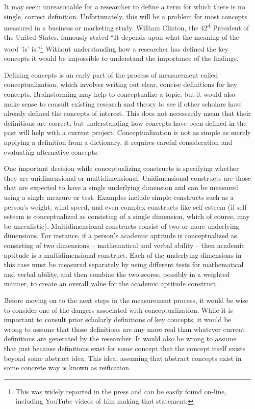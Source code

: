 It may seem unreasonable for a researcher to define a term for which there is no single, correct definition. Unfortunately, this will be a problem for most concepts measured in a business or marketing study. William Clinton, the 42\textsuperscript{d} President of the United States, famously stated ``It depends upon what the meaning of the word 'is' is.''\footnote{This was widely reported in the press and can be easily found on-line, including YouTube videos of him making that statement.} Without understanding how a researcher has defined the key concepts it would be impossible to understand the importance of the findings.

Defining concepts is an early part of the process of measurement called conceptualization, which involves writing out clear, concise definitions for key concepts. Brainstorming may help to conceptualize a topic, but it would also make sense to consult existing research and theory to see if other scholars have already defined the concepts of interest. This does not necessarily mean that their definitions are correct, but understanding how concepts have been defined in the past will help with a current project. Conceptualization is not as simple as merely applying a definition from a dictionary, it requires careful consideration and evaluating alternative concepts.

One important decision while conceptualizing constructs is specifying whether they are unidimensional or multidimensional. Unidimensional constructs are those that are expected to have a single underlying dimension and can be measured using a single measure or test. Examples include simple constructs such as a person's weight, wind speed, and even complex constructs like self-esteem (if self-esteem is conceptualized as consisting of a single dimension, which of course, may be unrealistic). Multidimensional constructs consist of two or more underlying dimensions. For instance, if a person's academic aptitude is conceptualized as consisting of two dimensions – mathematical and verbal ability – then academic aptitude is a multidimensional construct. Each of the underlying dimensions in this case must be measured separately by using different tests for mathematical and verbal ability, and then combine the two scores, possibly in a weighted manner, to create an overall value for the academic aptitude construct.

Before moving on to the next steps in the measurement process, it would be wise to consider one of the dangers associated with conceptualization. While it is important to consult prior scholarly definitions of key concepts, it would be wrong to assume that those definitions are any more real than whatever current definitions are generated by the researcher. It would also be wrong to assume that just because definitions exist for some concept that the concept itself exists beyond some abstract idea. This idea, assuming that abstract concepts exist in some concrete way is known as reification.

